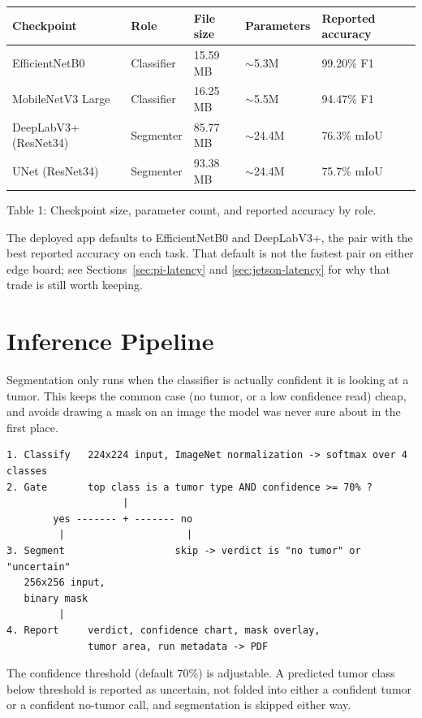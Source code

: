 \documentclass[11pt]{article}
\begin{document}
\begin{center}
\begin{tabular}{lllll}
\toprule
Checkpoint & Role & File size & Parameters & Reported accuracy \\
\midrule
EfficientNetB0 & Classifier & 15.59 MB & $\sim$5.3M & 99.20\% F1 \\
MobileNetV3 Large & Classifier & 16.25 MB & $\sim$5.5M & 94.47\% F1 \\
DeepLabV3+ (ResNet34) & Segmenter & 85.77 MB & $\sim$24.4M & 76.3\% mIoU \\
UNet (ResNet34) & Segmenter & 93.38 MB & $\sim$24.4M & 75.7\% mIoU \\
\bottomrule
\end{tabular}
\end{center}
\begin{center}\small Table 1: Checkpoint size, parameter count, and reported accuracy by role.\end{center}

The deployed app defaults to EfficientNetB0 and DeepLabV3+, the pair with the best
reported accuracy on each task. That default is not the fastest pair on either edge
board; see Sections~\ref{sec:pi-latency} and \ref{sec:jetson-latency} for why that trade
is still worth keeping.

\section{Inference Pipeline}

Segmentation only runs when the classifier is actually confident it is looking at a
tumor. This keeps the common case (no tumor, or a low confidence read) cheap, and avoids
drawing a mask on an image the model was never sure about in the first place.

\begin{verbatim}
1. Classify   224x224 input, ImageNet normalization -> softmax over 4 classes
2. Gate       top class is a tumor type AND confidence >= 70% ?
                    |
        yes ------- + ------- no
         |                     |
3. Segment                   skip -> verdict is "no tumor" or "uncertain"
   256x256 input,
   binary mask
         |
4. Report     verdict, confidence chart, mask overlay,
              tumor area, run metadata -> PDF
\end{verbatim}

The confidence threshold (default 70\%) is adjustable. A predicted tumor class below
threshold is reported as uncertain, not folded into either a confident tumor or a
confident no-tumor call, and segmentation is skipped either way.
\end{document}
